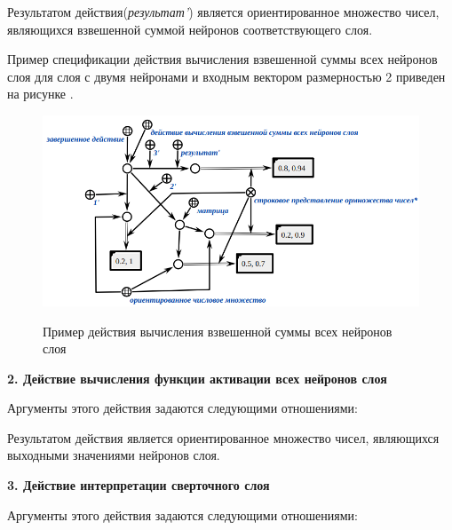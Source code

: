 Результатом действия(\textit{результат'}) является ориентированное множество чисел, являющихся взвешенной суммой нейронов соответствующего слоя.

Пример спецификации действия вычисления взвешенной суммы всех нейронов слоя для слоя с двумя нейронами и входным вектором размерностью 2 приведен на рисунке \textit{}.

\begin{figure}
	\centering
	\caption{Пример действия вычисления взвешенной суммы всех нейронов слоя}
	\includegraphics[width=0.95\linewidth]{author/part3/figures/action_weighted_sum.png}
	\label{fig:action_weighted_sum}
\end{figure}


\textbf{2. Действие вычисления функции активации всех нейронов слоя}

Аргументы этого действия задаются следующими отношениями:
\begin{SCn}


\end{SCn}

Результатом действия является ориентированное множество чисел, являющихся выходными значениями нейронов слоя.


\textbf{3. Действие интерпретации сверточного слоя}

Аргументы этого действия задаются следующими отношениями:
\begin{SCn}


\end{SCn}


